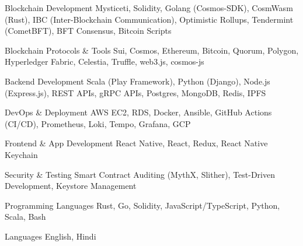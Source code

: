 


\begin{cvskills}

  \cvskill
    {Blockchain Development} %
    {
      Mysticeti, Solidity, Golang (Cosmos-SDK), CosmWasm (Rust), IBC (Inter-Blockchain Communication), Optimistic Rollups, Tendermint (CometBFT), BFT Consensus, Bitcoin Scripts
    } %

  \cvskill
    {Blockchain Protocols \& Tools} %
    {Sui, Cosmos, Ethereum, Bitcoin, Quorum, Polygon, Hyperledger Fabric, Celestia, Truffle, web3.js, cosmos-js} %

  \cvskill
    {Backend Development} %
    {Scala (Play Framework), Python (Django), Node.js (Express.js), REST APIs, gRPC APIs, Postgres, MongoDB, Redis, IPFS} %

  \cvskill
    {DevOps \& Deployment} %
    {AWS EC2, RDS, Docker, Ansible, GitHub Actions (CI/CD), Prometheus, Loki, Tempo, Grafana, GCP} %

  \cvskill
    {Frontend \& App Development} %
    {React Native, React, Redux, React Native Keychain } %

  \cvskill
    {Security \& Testing} %
    {Smart Contract Auditing (MythX, Slither), Test-Driven Development, Keystore Management} %

  \cvskill
    {Programming Languages} %
    {Rust, Go, Solidity, JavaScript/TypeScript, Python, Scala, Bash} %

  \cvskill
    {Languages} %
    {English, Hindi} %

\end{cvskills}
